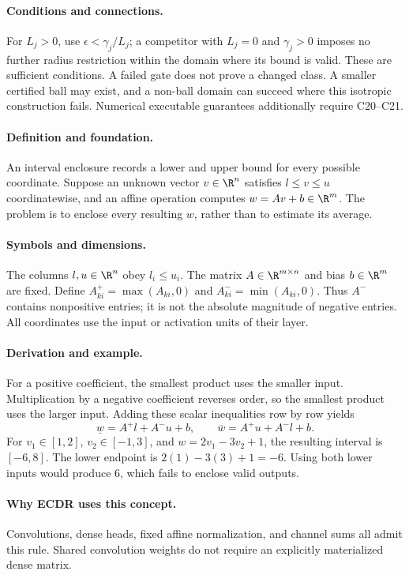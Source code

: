\paragraph{Conditions and connections.}
For $L_j>0$, use $\epsilon<\gamma_j/L_j$; a competitor with $L_j=0$ and $\gamma_j>0$ imposes no further radius restriction within the domain where its bound is valid. These are sufficient conditions. A failed gate does not prove a changed class. A smaller certified ball may exist, and a non-ball domain can succeed where this isotropic construction fails. Numerical executable guarantees additionally require C20--C21.

\paragraph{Definition and foundation.}
An interval enclosure records a lower and upper bound for every possible coordinate. Suppose an unknown vector $v\in\R^n$ satisfies $l\le v\le u$ coordinatewise, and an affine operation computes $w=Av+b\in\R^m$. The problem is to enclose every resulting $w$, rather than to estimate its average.
\paragraph{Symbols and dimensions.}
The columns $l,u\in\R^n$ obey $l_i\le u_i$. The matrix $A\in\R^{m\times n}$ and bias $b\in\R^m$ are fixed. Define $A^+_{ki}=\max(A_{ki},0)$ and $A^-_{ki}=\min(A_{ki},0)$. Thus $A^-$ contains nonpositive entries; it is not the absolute magnitude of negative entries. All coordinates use the input or activation units of their layer.
\paragraph{Derivation and example.}
For a positive coefficient, the smallest product uses the smaller input. Multiplication by a negative coefficient reverses order, so the smallest product uses the larger input. Adding these scalar inequalities row by row yields
\[
 \underline w=A^+l+A^-u+b,\qquad
 \overline w=A^+u+A^-l+b.
\]
For $v_1\in[1,2]$, $v_2\in[-1,3]$, and $w=2v_1-3v_2+1$, the resulting interval is $[-6,8]$. The lower endpoint is $2(1)-3(3)+1=-6$. Using both lower inputs would produce 6, which fails to enclose valid outputs.
\paragraph{Why ECDR uses this concept.}
Convolutions, dense heads, fixed affine normalization, and channel sums all admit this rule. Shared convolution weights do not require an explicitly materialized dense matrix.
